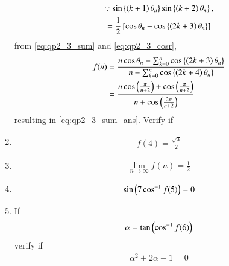 \begin{enumerate}[label=\arabic*.,ref=\thesubsection.\theenumi]
\begin{multline}
\because \sin\left\{\left(k+1\right)\theta_n\right\}
\sin\left\{\left(k+2\right)\theta_n\right\} ,
\\
= \frac{1}{2}{}\left[\cos \theta_n-\cos \left\{\left(2k+3\right)\theta_n\right\}\right]
\end{multline}
from \eqref{eq:qp2_3_sum} and \eqref{eq:qp2_3_cosr},
\begin{align}
\label{eq:qp2_3_sum_sol}
f(n) & = \frac{n\cos \theta_n-\sum_{k=0}^{n}\cos \left\{\left(2k+3\right)\theta_n\right\}}{n-\sum_{k=0}^{n}\cos\left\{\left(2k+4\right)\theta_n\right\}}
\nonumber \\
&= \frac{n\cos \left(\frac{\pi}{n+2}\right)+\cos \left(\frac{\pi}{n+2}\right)}{n+\cos\left(\frac{2\pi}{n+2}\right)}
\end{align}
resulting in \eqref{eq:qp2_3_sum_ans}.  Verify if 
\item 
\begin{align}
f(4) = \frac{\sqrt{3}}{2}
\end{align}
\item 
\begin{align}
\lim_{n \to \infty}f(n) = \frac{1}{2}
\end{align}
\item 
\begin{align}
\sin\left(7 \cos^{-1}f(5)\right) = 0
\end{align}
\item If 
\begin{align}
\alpha = 
\tan\left( \cos^{-1}f(6)\right) 
\end{align}
verify if 
\begin{align}
\alpha^2 +2\alpha -1 =  0 
\end{align}
\end{enumerate}
%
